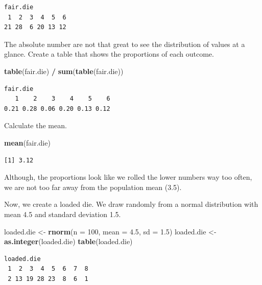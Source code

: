 \documentclass[]{article}
\newenvironment{Shaded}{\begin{snugshade}}{\end{snugshade}}
\newcommand{\KeywordTok}[1]{\textcolor[rgb]{0.13,0.29,0.53}{\textbf{#1}}}
\newcommand{\DataTypeTok}[1]{\textcolor[rgb]{0.13,0.29,0.53}{#1}}
\newcommand{\DecValTok}[1]{\textcolor[rgb]{0.00,0.00,0.81}{#1}}
\newcommand{\FloatTok}[1]{\textcolor[rgb]{0.00,0.00,0.81}{#1}}
\newcommand{\StringTok}[1]{\textcolor[rgb]{0.31,0.60,0.02}{#1}}
\newcommand{\OperatorTok}[1]{\textcolor[rgb]{0.81,0.36,0.00}{\textbf{#1}}}
\newcommand{\NormalTok}[1]{#1}
\theoremstyle{definition}
\theoremstyle{definition}
\theoremstyle{definition}
\theoremstyle{remark}
\begin{document}
\begin{verbatim}
fair.die
 1  2  3  4  5  6 
21 28  6 20 13 12 
\end{verbatim}

The absolute number are not that great to see the distribution of values
at a glance. Create a table that shows the proportions of each outcome.

\begin{Shaded}
\begin{Highlighting}[]
\KeywordTok{table}\NormalTok{(fair.die) }\OperatorTok{/}\StringTok{ }\KeywordTok{sum}\NormalTok{(}\KeywordTok{table}\NormalTok{(fair.die))}
\end{Highlighting}
\end{Shaded}

\begin{verbatim}
fair.die
   1    2    3    4    5    6 
0.21 0.28 0.06 0.20 0.13 0.12 
\end{verbatim}

Calculate the mean.

\begin{Shaded}
\begin{Highlighting}[]
\KeywordTok{mean}\NormalTok{(fair.die)}
\end{Highlighting}
\end{Shaded}

\begin{verbatim}
[1] 3.12
\end{verbatim}

Although, the proportions look like we rolled the lower numbers way too
often, we are not too far away from the population mean (3.5).

Now, we create a loaded die. We draw randomly from a normal distribution
with mean 4.5 and standard deviation 1.5.

\begin{Shaded}
\begin{Highlighting}[]
\NormalTok{loaded.die <-}\StringTok{ }\KeywordTok{rnorm}\NormalTok{(}\DataTypeTok{n =} \DecValTok{100}\NormalTok{, }\DataTypeTok{mean =} \FloatTok{4.5}\NormalTok{, }\DataTypeTok{sd =} \FloatTok{1.5}\NormalTok{)}
\NormalTok{loaded.die <-}\StringTok{ }\KeywordTok{as.integer}\NormalTok{(loaded.die)}
\KeywordTok{table}\NormalTok{(loaded.die)}
\end{Highlighting}
\end{Shaded}

\begin{verbatim}
loaded.die
 1  2  3  4  5  6  7  8 
 2 13 19 28 23  8  6  1 
\end{verbatim}
\end{document}
